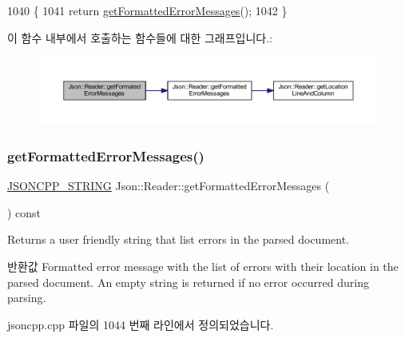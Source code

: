 \begin{DoxyCode}
1040                                                       \{
1041   \textcolor{keywordflow}{return} \hyperlink{class_json_1_1_reader_ae638a7b1f36f7ccf99ba89fa36ccf222}{getFormattedErrorMessages}();
1042 \}
\end{DoxyCode}
이 함수 내부에서 호출하는 함수들에 대한 그래프입니다.\+:\nopagebreak
\begin{figure}[H]
\begin{center}
\leavevmode
\includegraphics[width=350pt]{class_json_1_1_reader_a791cbc5afd1bef1631e07239dc452c79_cgraph}
\end{center}
\end{figure}
\mbox{\label{class_json_1_1_reader_ae638a7b1f36f7ccf99ba89fa36ccf222}} 
\subsubsection{\texorpdfstring{get\+Formatted\+Error\+Messages()}{getFormattedErrorMessages()}}
{\footnotesize\ttfamily \hyperlink{json_8h_a1e723f95759de062585bc4a8fd3fa4be}{J\+S\+O\+N\+C\+P\+P\+\_\+\+S\+T\+R\+I\+NG} Json\+::\+Reader\+::get\+Formatted\+Error\+Messages (\begin{DoxyParamCaption}{ }\end{DoxyParamCaption}) const}



Returns a user friendly string that list errors in the parsed document. 

\begin{DoxyReturn}{반환값}
Formatted error message with the list of errors with their location in the parsed document. An empty string is returned if no error occurred during parsing. 
\end{DoxyReturn}


jsoncpp.\+cpp 파일의 1044 번째 라인에서 정의되었습니다.


